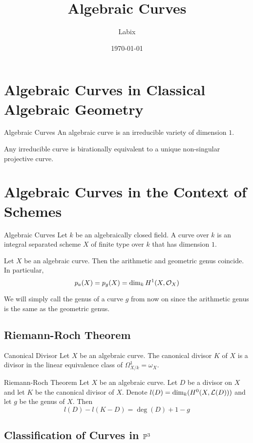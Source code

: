\documentclass[a4paper]{article}
\title{Algebraic Curves}
\author{Labix}
\date{\today}
\begin{document}
\maketitle
\begin{abstract}
\end{abstract}
\pagebreak
\tableofcontents
\pagebreak

\section{Algebraic Curves in Classical Algebraic Geometry}
\begin{defn}{Algebraic Curves}{} An algebraic curve is an irreducible variety of dimension $1$. 
\end{defn}

\begin{thm}{}{} Any irreducible curve is birationally equivalent to a unique non-singular projective curve. 
\end{thm}

\section{Algebraic Curves in the Context of Schemes}
\begin{defn}{Algebraic Curves}{} Let $k$ be an algebraically closed field. A curve over $k$ is an integral separated scheme $X$ of finite type over $k$ that has dimension $1$. 
\end{defn}

\begin{prp}{}{} Let $X$ be an algebraic curve. Then the arithmetic and geometric genus coincide. In particular, $$p_a(X)=p_g(X)=\dim_kH^1(X,\mathcal{O}_X)$$
\end{prp}

We will simply call the genus of a curve $g$ from now on since the arithmetic genus is the same as the geometric genus. 

\subsection{Riemann-Roch Theorem}
\begin{defn}{Canonical Divisor}{} Let $X$ be an algebraic curve. The canonical divisor $K$ of $X$ is a divisor in the linear equivalence class of $\Omega_{X/k}^1=\omega_X$. 
\end{defn}

\begin{thm}{Riemann-Roch Theorem}{} Let $X$ be an algebraic curve. Let $D$ be a divisor on $X$ and let $K$ be the canonical divisor of $X$. Denote $l(D)=\dim_k(H^0(X,\mathcal{L}(D)))$ and let $g$ be the genus of $X$. Then $$l(D)-l(K-D)=\deg(D)+1-g$$
\end{thm}

\subsection{Classification of Curves in $\mathbb{P}^3$}
\end{document}
